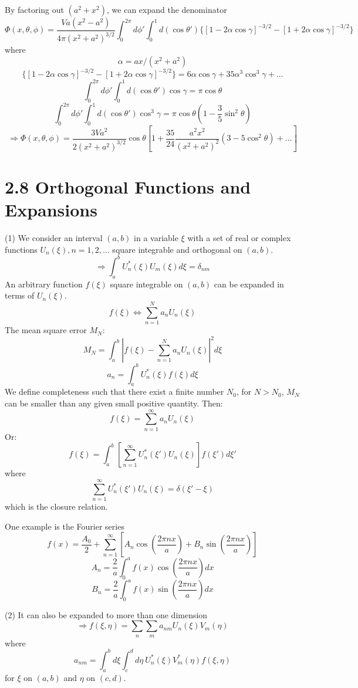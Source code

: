 \documentclass{article}
\begin{document}
	By factoring out $(a^2+x^2)$, we can expand the denominator
	$$
	\Phi(x, \theta, \phi) = \frac{Va(x^2-a^2)}{4\pi(x^2+a^2)^{3/2}} \int_0^{2\pi}d\phi' \int_0^1 d(\cos\theta') \{ [1-2\alpha\cos\gamma]^{-3/2} - [1+2\alpha\cos\gamma]^{-3/2} \}
	$$
	where
	$$
	\alpha = ax/(x^2+a^2)
	$$
	$$
	\{ [1-2\alpha\cos\gamma]^{-3/2} - [1+2\alpha\cos\gamma]^{-3/2} \} = 6\alpha\cos\gamma + 35\alpha^3\cos^3\gamma + \dots
	$$
	$$
	\int_0^{2\pi}d\phi' \int_0^1 d(\cos\theta') \cos\gamma = \pi \cos\theta
	$$
	$$
	\int_0^{2\pi}d\phi' \int_0^1 d(\cos\theta') \cos^3\gamma = \pi \cos\theta (1 - \frac{3}{5}\sin^2\theta)
	$$
	$$
	\Rightarrow \Phi(x, \theta, \phi) = \frac{3Va^2}{2(x^2+a^2)^{3/2}}\cos\theta \left[ 1 + \frac{35}{24}\frac{a^2x^2}{(x^2+a^2)^2}(3-5\cos^2\theta) + \dots \right]
	$$
	
	\section*{2.8 Orthogonal Functions and Expansions}
	(1) We consider an interval $(a,b)$ in a variable $\xi$ with a set of real or complex functions $U_n(\xi), n=1,2,\dots$ square integrable and orthogonal on $(a,b)$.
	$$
	\Rightarrow \int_a^b U_n^*(\xi) U_m(\xi) d\xi = \delta_{nm}
	$$
	An arbitrary function $f(\xi)$ square integrable on $(a,b)$ can be expanded in terms of $U_n(\xi)$.
	$$
	f(\xi) \Leftrightarrow \sum_{n=1}^N a_n U_n(\xi)
	$$
	The mean square error $M_N$:
	$$
	M_N = \int_a^b \left|f(\xi) - \sum_{n=1}^N a_n U_n(\xi)\right|^2 d\xi
	$$
	$$
	a_n = \int_a^b U_n^*(\xi) f(\xi) d\xi
	$$
	We define completeness such that there exist a finite number $N_0$, for $N>N_0$, $M_N$ can be smaller than any given small positive quantity. Then:
	$$
	f(\xi) = \sum_{n=1}^{\infty} a_n U_n(\xi)
	$$
	Or:
	$$
	f(\xi) = \int_a^b \left[ \sum_{n=1}^{\infty} U_n^*(\xi') U_n(\xi) \right] f(\xi') d\xi'
	$$
	where
	$$
	\sum_{n=1}^{\infty} U_n^*(\xi') U_n(\xi) = \delta(\xi'-\xi)
	$$
	which is the closure relation.
	
	One example is the Fourier series
	$$
	f(x) = \frac{A_0}{2} + \sum_{n=1}^\infty [A_n \cos(\frac{2\pi n x}{a}) + B_n \sin(\frac{2\pi n x}{a})]
	$$
	$$
	A_n = \frac{2}{a} \int_0^a f(x) \cos(\frac{2\pi n x}{a}) dx
	$$
	$$
	B_n = \frac{2}{a} \int_0^a f(x) \sin(\frac{2\pi n x}{a}) dx
	$$
	
	(2) It can also be expanded to more than one dimension
	$$
	\Rightarrow f(\xi, \eta) = \sum_n \sum_m a_{nm} U_n(\xi) V_m(\eta)
	$$
	where
	$$
	a_{nm} = \int_a^b d\xi \int_c^d d\eta\ U_n^*(\xi) V_m^*(\eta) f(\xi, \eta)
	$$
	for $\xi$ on $(a,b)$ and $\eta$ on $(c,d)$.
	
\end{document}
